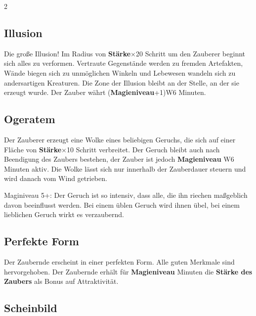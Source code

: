 \begin{multicols*}{2}


\subsection{Illusion}

Die große Illusion! Im Radius von \textbf{Stärke}×20 Schritt um den Zauberer beginnt sich alles zu verformen. Vertraute Gegenstände werden zu fremden Artefakten, Wände biegen sich zu unmöglichen Winkeln und Lebewesen wandeln sich zu andersartigen Kreaturen. Die Zone der Illusion bleibt an der Stelle, an der sie erzeugt wurde. Der Zauber währt (\textbf{Magieniveau}+1)W6 Minuten.



\subsection{Ogeratem}

Der Zauberer erzeugt eine Wolke eines beliebigen Geruchs, die sich auf einer Fläche von \textbf{Stärke}×10 Schritt verbreitet. Der Geruch bleibt auch nach Beendigung des Zaubers bestehen, der Zauber ist jedoch \textbf{Magieniveau} W6 Minuten aktiv. Die Wolke lässt sich nur innerhalb der Zauberdauer steuern und wird danach vom Wind getrieben.

Maginiveau 5+: Der Geruch ist so intensiv, dass alle, die ihn riechen maßgeblich davon beeinflusst werden. Bei einem üblen Geruch wird ihnen übel, bei einem lieblichen Geruch wirkt es verzaubernd.



\subsection{Perfekte Form}

Der Zaubernde erscheint in einer perfekten Form. Alle guten Merkmale sind hervorgehoben. Der Zaubernde erhält für \textbf{Magieniveau} Minuten die \textbf{Stärke des Zaubers} als Bonus auf Attraktivität.



\subsection{Scheinbild}


\end{multicols*}

